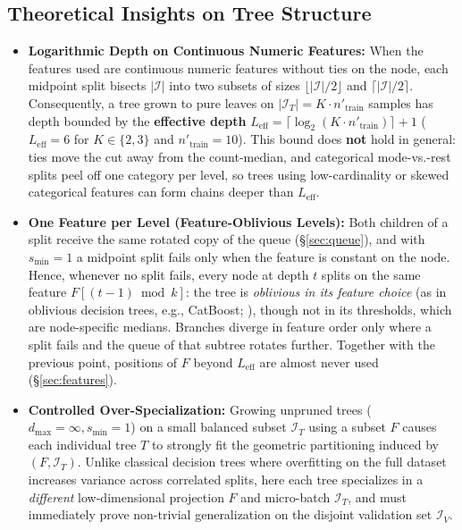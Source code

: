 \documentclass[11pt,a4paper]{article}
\begin{document}
\subsection{Theoretical Insights on Tree Structure}
\label{sec:structure}

\begin{itemize}[leftmargin=*, itemsep=4pt]
  \item \textbf{Logarithmic Depth on Continuous Numeric Features:} When the features used are continuous numeric features without ties on the node, each midpoint split bisects $|\mathcal{I}|$ into two subsets of sizes $\lfloor |\mathcal{I}|/2 \rfloor$ and $\lceil |\mathcal{I}|/2 \rceil$. Consequently, a tree grown to pure leaves on $|\mathcal{I}_T| = K \cdot n'_{\text{train}}$ samples has depth bounded by the \textbf{effective depth} $L_{\text{eff}} = \lceil \log_2(K \cdot n'_{\text{train}}) \rceil + 1$ ($L_{\text{eff}} = 6$ for $K \in \{2, 3\}$ and $n'_{\text{train}} = 10$). This bound does \textbf{not} hold in general: ties move the cut away from the count-median, and categorical mode-vs.-rest splits peel off one category per level, so trees using low-cardinality or skewed categorical features can form chains deeper than $L_{\text{eff}}$.
  \item \textbf{One Feature per Level (Feature-Oblivious Levels):} Both children of a split receive the same rotated copy of the queue (\S\ref{sec:queue}), and with $s_{\min} = 1$ a midpoint split fails only when the feature is constant on the node. Hence, whenever no split fails, every node at depth $t$ splits on the same feature $F[(t-1) \bmod k]$: the tree is \emph{oblivious in its feature choice} (as in oblivious decision trees, e.g., CatBoost; \citealp{prokhorenkova2018}), though not in its thresholds, which are node-specific medians. Branches diverge in feature order only where a split fails and the queue of that subtree rotates further. Together with the previous point, positions of $F$ beyond $L_{\text{eff}}$ are almost never used (\S\ref{sec:features}).
  \item \textbf{Controlled Over-Specialization:} Growing unpruned trees ($d_{\max} = \infty, s_{\min} = 1$) on a small balanced subset $\mathcal{I}_T$ using a subset $F$ causes each individual tree $T$ to strongly fit the geometric partitioning induced by $(F, \mathcal{I}_T)$. Unlike classical decision trees where overfitting on the full dataset increases variance across correlated splits, here each tree specializes in a \emph{different} low-dimensional projection $F$ and micro-batch $\mathcal{I}_T$, and must immediately prove non-trivial generalization on the disjoint validation set $\mathcal{I}_V$.
\end{itemize}
\end{document}
